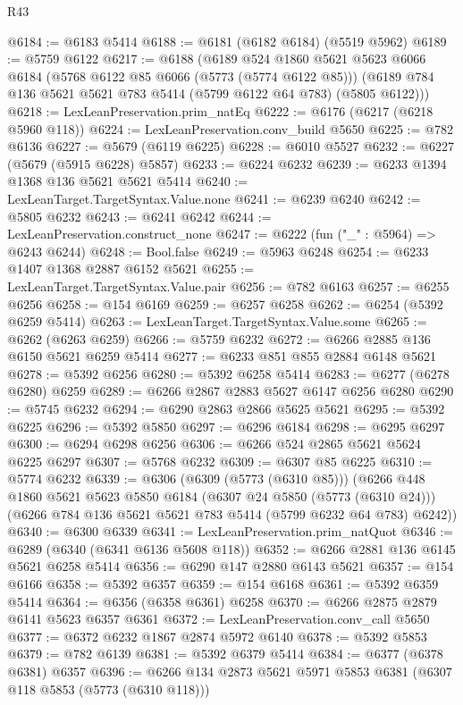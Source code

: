 \begin{lexlean}{R43}
\begin{coremodule}
@6184 := @6183 @5414
@6188 := @6181 (@6182 @6184) (@5519 @5962)
@6189 := @5759 @6122
@6217 := @6188
    (@6189
      @524
      @1860
      @5621
      @5623
      @6066
      @6184
      (@5768 @6122 @85 @6066 (@5773 (@5774 @6122 @85)))
      (@6189 @784 @136 @5621 @5621 @783 @5414 (@5799 @6122 @64 @783) (@5805 @6122)))
@6218 := LexLeanPreservation.prim_natEq
@6222 := @6176 (@6217 (@6218 @5960 @118))
@6224 := LexLeanPreservation.conv_build @5650
@6225 := @782 @6136
@6227 := @5679 (@6119 @6225)
@6228 := @6010 @5527
@6232 := @6227 (@5679 (@5915 @6228) @5857)
@6233 := @6224 @6232
@6239 := @6233 @1394 @1368 @136 @5621 @5621 @5414
@6240 := LexLeanTarget.TargetSyntax.Value.none
@6241 := @6239 @6240
@6242 := @5805 @6232
@6243 := @6241 @6242
@6244 := LexLeanPreservation.construct_none
@6247 := @6222 (fun ("_" : @5964) => @6243 @6244)
@6248 := Bool.false
@6249 := @5963 @6248
@6254 := @6233 @1407 @1368 @2887 @6152 @5621
@6255 := LexLeanTarget.TargetSyntax.Value.pair
@6256 := @782 @6163
@6257 := @6255 @6256
@6258 := @154 @6169
@6259 := @6257 @6258
@6262 := @6254 (@5392 @6259 @5414)
@6263 := LexLeanTarget.TargetSyntax.Value.some
@6265 := @6262 (@6263 @6259)
@6266 := @5759 @6232
@6272 := @6266 @2885 @136 @6150 @5621 @6259 @5414
@6277 := @6233 @851 @855 @2884 @6148 @5621
@6278 := @5392 @6256
@6280 := @5392 @6258 @5414
@6283 := @6277 (@6278 @6280) @6259
@6289 := @6266 @2867 @2883 @5627 @6147 @6256 @6280
@6290 := @5745 @6232
@6294 := @6290 @2863 @2866 @5625 @5621
@6295 := @5392 @6225
@6296 := @5392 @5850
@6297 := @6296 @6184
@6298 := @6295 @6297
@6300 := @6294 @6298 @6256
@6306 := @6266 @524 @2865 @5621 @5624 @6225 @6297
@6307 := @5768 @6232
@6309 := @6307 @85 @6225
@6310 := @5774 @6232
@6339 := @6306
    (@6309 (@5773 (@6310 @85)))
    (@6266
      @448
      @1860
      @5621
      @5623
      @5850
      @6184
      (@6307 @24 @5850 (@5773 (@6310 @24)))
      (@6266 @784 @136 @5621 @5621 @783 @5414 (@5799 @6232 @64 @783) @6242))
@6340 := @6300 @6339
@6341 := LexLeanPreservation.prim_natQuot
@6346 := @6289 (@6340 (@6341 @6136 @5608 @118))
@6352 := @6266 @2881 @136 @6145 @5621 @6258 @5414
@6356 := @6290 @147 @2880 @6143 @5621
@6357 := @154 @6166
@6358 := @5392 @6357
@6359 := @154 @6168
@6361 := @5392 @6359 @5414
@6364 := @6356 (@6358 @6361) @6258
@6370 := @6266 @2875 @2879 @6141 @5623 @6357 @6361
@6372 := LexLeanPreservation.conv_call @5650
@6377 := @6372 @6232 @1867 @2874 @5972 @6140
@6378 := @5392 @5853
@6379 := @782 @6139
@6381 := @5392 @6379 @5414
@6384 := @6377 (@6378 @6381) @6357
@6396 := @6266 @134 @2873 @5621 @5971 @5853 @6381 (@6307 @118 @5853 (@5773 (@6310 @118)))

\end{coremodule}
\end{lexlean}
